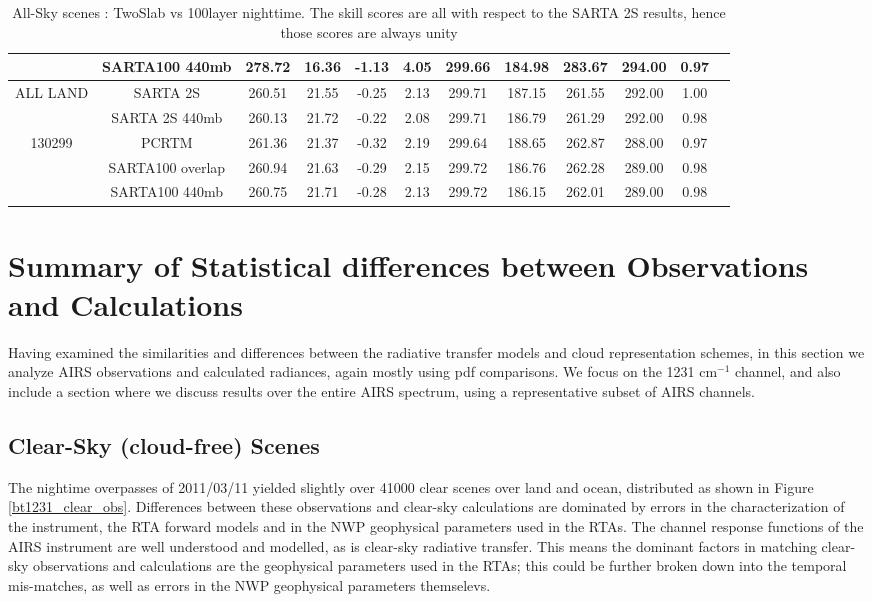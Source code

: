 \documentclass[agupp]{aguplus}              %
\newcommand{\wn}{cm$^{-1}$\xspace}
\begin{document}
\begin{article}
\begin{center}
\begin{table}[ht]
{\begin{tabular}{cccccccccccc}
              & SARTA100 440mb & 278.72 & 16.36  & -1.13 &  4.05 & 299.66 & 184.98 & 283.67 & 294.00 &  0.97 \\
\hline
ALL  LAND   & SARTA 2S & 260.51 & 21.55  & -0.25 &  2.13 & 299.71 & 187.15 & 261.55 & 292.00 &  1.00 \\
              & SARTA 2S 440mb & 260.13 & 21.72  & -0.22 &  2.08 & 299.71 & 186.79 & 261.29 & 292.00 &  0.98\\ 
   130299        & PCRTM & 261.36 & 21.37  & -0.32 &  2.19 & 299.64 & 188.65 & 262.87 & 288.00 &  0.97 \\
              & SARTA100 overlap & 260.94 & 21.63  & -0.29 &  2.15 & 299.72 & 186.76 & 262.28 & 289.00 &  0.98 \\
              & SARTA100 440mb & 260.75 & 21.71  & -0.28 &  2.13 & 299.72 & 186.15 & 262.01 & 289.00 &  0.98 \\
\hline %
\end{tabular}}
\hfill{}
\caption{All-Sky scenes : TwoSlab vs 100layer nighttime. The skill scores are all with respect to the SARTA 2S
results, hence those scores are always unity}
\label{table:SvsP} %
\end{table}
\end{center}

\section{Summary of Statistical differences between Observations and Calculations} 

Having examined the similarities and differences between the radiative
transfer models and cloud representation schemes, in this section we
analyze AIRS observations and calculated radiances, again mostly using
pdf comparisons. We focus on the 1231 \wn channel, and also include a section where
we discuss results over the entire AIRS spectrum, using a representative subset of
AIRS channels.

\subsection{Clear-Sky (cloud-free) Scenes} 
\label{Clear-Sky}

The nightime overpasses of 2011/03/11 yielded slightly over 41000
clear scenes over land and ocean, distributed as shown in Figure
\ref{bt1231_clear_obs}. Differences between these observations and
clear-sky calculations are dominated by errors in the
characterization of the instrument, the RTA forward models and in the
NWP geophysical parameters used in the RTAs. The channel response
functions of the AIRS instrument are well understood and modelled, as
is clear-sky radiative transfer. This means the dominant factors in
matching clear-sky observations and calculations are the geophysical
parameters used in the RTAs; this could be further broken down into the
temporal mis-matches, as well as errors in the NWP geophysical
parameters themselevs.


\end{article}
\end{document}
